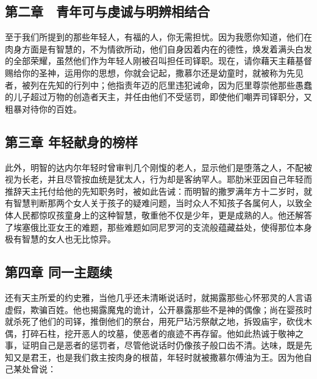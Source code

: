 
\subsection{第二章　青年可与虔诚与明辨相结合}

至于我们所提到的那些年轻人，有福的人，你无需担忧。因为我愿你知道，他们在肉身方面是有智慧的，不为情欲所动，他们自身因着内在的德性，焕发着满头白发的全部荣耀，虽然他们作为年轻人刚被召叫担任司铎职。现在，请你藉天主藉基督赐给你的圣神，运用你的思想，你就会记起，撒慕尔还是幼童时，就被称为先见者，被列在先知的行列中；他指责年迈的厄里违犯诫命，因为厄里尊崇他那些愚蠢的儿子超过万物的创造者天主，并任由他们不受惩罚，即使他们嘲弄司铎职分，又粗暴对待你的百姓。\par


\subsection{第三章 年轻献身的榜样}

此外，明智的达内尔年轻时曾审判几个刚愎的老人，显示他们是堕落之人，不配被视为长老，并且尽管按血统是犹太人，行为却是客纳罕人。耶肋米亚因自己年轻而推辞天主托付给他的先知职务时，被如此告诫：而明智的撒罗满年方十二岁时，就有智慧判断那两个女人关于孩子的疑难问题，当时众人不知孩子各属何人，以致全体人民都惊叹孩童身上的这种智慧，敬重他不仅是少年，更是成熟的人。他还解答了埃塞俄比亚女王的难题，那些难题如同尼罗河的支流般蕴藏益处，使得那位本身极有智慧的女人也无比惊异。\par


\subsection{第四章 同一主题续}

还有天主所爱的约史雅，当他几乎还未清晰说话时，就揭露那些心怀邪灵的人言语虚假，欺骗百姓。他也揭露魔鬼的诡计，公开暴露那些不是神的偶像；尚在婴孩时就杀死了他们的司铎，推倒他们的祭台，用死尸玷污祭献之地，拆毁庙宇，砍伐木偶，打碎石柱，挖开恶人的坟墓，使恶者的痕迹不再存留。他如此热诚于敬神之事，证明自己是恶者的惩罚者，尽管他说话时仍像孩子般口齿不清。达味，既是先知又是君王，也是我们救主按肉身的根苗，年轻时就被撒慕尔傅油为王。因为他自己某处曾说：\par

